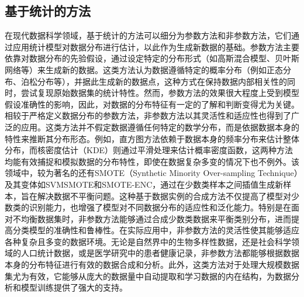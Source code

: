 \documentclass{NauThesis}
\begin{document}
\subsection{基于统计的方法}
在现代数据科学领域，基于统计的方法可以细分为参数方法和非参数方法，它们通过应用统计模型对数据分布进行估计，以此作为生成新数据的基础。参数方法主要依靠对数据分布的先验假设，通过设定特定的分布形式（如高斯混合模型、贝叶斯网络等）来生成新的数据\cite{ref25,ref26}。这类方法认为数据遵循特定的概率分布（例如正态分布、泊松分布等），并据此生成新的数据点，这种方式在保持数据内部相关性的同时，尝试复现原始数据集的统计特性。然而，参数方法的效果很大程度上受到模型假设准确性的影响，因此，对数据的分布特征有一定的了解和判断变得尤为关键\cite{ref27,ref28,ref29}。
\\\hspace*{2em}相较于严格定义数据分布的参数方法，非参数方法以其灵活性和适应性也得到了广泛的应用。这类方法并不假定数据遵循任何特定的数学分布，而是依据数据本身的特性来推断其分布形态。例如，直方图方法依赖于数据本身的频率分布来估计整体分布，而核密度估计（KDE）则通过平滑处理来估计概率密度函数，这两种方法均能有效捕捉和模拟数据的分布特性，即使在数据复杂多变的情况下也不例外\cite{ref30,ref31}。该领域中，较为著名的还有SMOTE（Synthetic Minority Over-sampling Technique）及其变体如SVMSMOTE和SMOTE-ENC，通过在少数类样本之间插值生成新样本，旨在解决数据不平衡问题。这种基于数据实例的合成方法不仅提高了模型对少数类的识别能力，也增强了模型对不同数据分布的适应性和泛化能力\cite{ref32,ref33}。特别是在面对不均衡数据集时，非参数方法能够通过合成少数类数据来平衡类别分布，进而提高分类模型的准确性和鲁棒性。在实际应用中，非参数方法的灵活性使其能够适应各种复杂且多变的数据环境。无论是自然界中的生物多样性数据，还是社会科学领域的人口统计数据，或是医学研究中的患者健康记录，非参数方法都能够根据数据本身的分布特征进行有效的数据合成和分析。此外，这类方法对于处理大规模数据集尤为有效，它能够从庞大的数据量中自动提取和学习数据的内在结构，为数据分析和模型训练提供了强大的支持\cite{ref34}。
\end{document}

